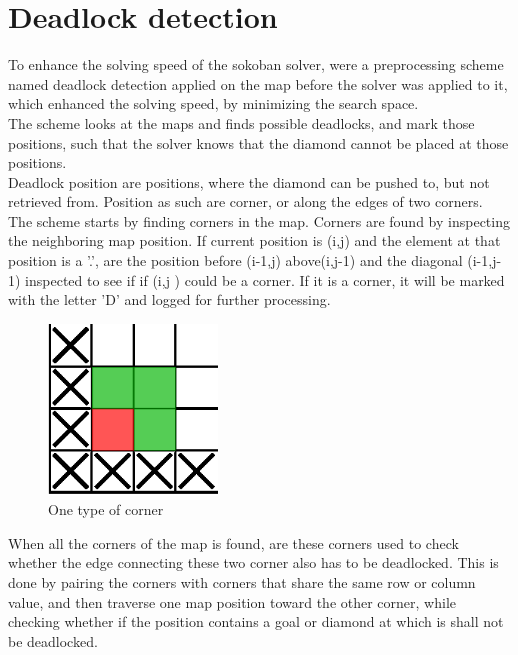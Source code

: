 \section{Deadlock detection}
To enhance the solving speed of the sokoban solver, were a preprocessing scheme named deadlock detection applied on the map before the solver was applied to it, which enhanced the solving speed,  by minimizing the search space. \\

The scheme looks at the maps and finds possible deadlocks, and mark those positions, such that the solver knows that the diamond cannot be placed at those positions. \\

Deadlock position are positions, where the diamond can be pushed to, but not retrieved from. Position as such are corner,  or along the edges of two corners.  \\



The scheme starts by finding corners in the map. Corners are found by inspecting the neighboring map position. 
If current position is (i,j) and the element at that position is a '.', are the position before (i-1,j) above(i,j-1) and the diagonal (i-1,j-1) inspected to see if if (i,j ) could be a corner.  If it is a corner, it will be  marked with the letter 'D' and logged for further processing. \\


\begin{figure}[H]
    \centering
        \includegraphics[width=0.40\textwidth]{images/deadlock_corner_leftup}
        \caption{One type of corner}
\end{figure}

When all the corners of the map is found, are these corners used to check whether the edge connecting these two corner also has to be deadlocked.   This is done by pairing the corners with corners that share the same row or column value, and then traverse one map position toward the other corner, while checking whether if the position contains a goal or diamond at which is shall not be deadlocked.\\

